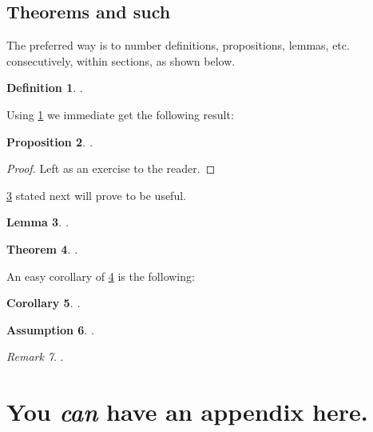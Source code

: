 \documentclass{article}
\theoremstyle{plain}
\newtheorem{theorem}{Theorem}[section]
\newtheorem{proposition}[theorem]{Proposition}
\newtheorem{lemma}[theorem]{Lemma}
\newtheorem{corollary}[theorem]{Corollary}
\theoremstyle{definition}
\newtheorem{definition}[theorem]{Definition}
\newtheorem{assumption}[theorem]{Assumption}
\theoremstyle{remark}
\newtheorem{remark}[theorem]{Remark}
\begin{document}
\subsection{Theorems and such}
The preferred way is to number definitions, propositions, lemmas, etc. consecutively, within sections, as shown below.
\begin{definition}
\label{def:inj}
.
\end{definition}
Using \cref{def:inj} we immediate get the following result:
\begin{proposition}
.
\end{proposition}
\begin{proof} 
Left as an exercise to the reader. 
\end{proof}
\cref{lem:usefullemma} stated next will prove to be useful.
\begin{lemma}
\label{lem:usefullemma}
.
\end{lemma}
\begin{theorem}
\label{thm:bigtheorem}
.
\end{theorem}
An easy corollary of \cref{thm:bigtheorem} is the following:
\begin{corollary}
.
\end{corollary}
\begin{assumption}
.
\label{ass:xfinite}
\end{assumption}
\begin{remark}
.
\end{remark}



\nocite{langley00}





\newpage
\appendix
\onecolumn
\section{You \emph{can} have an appendix here.}
\end{document}
